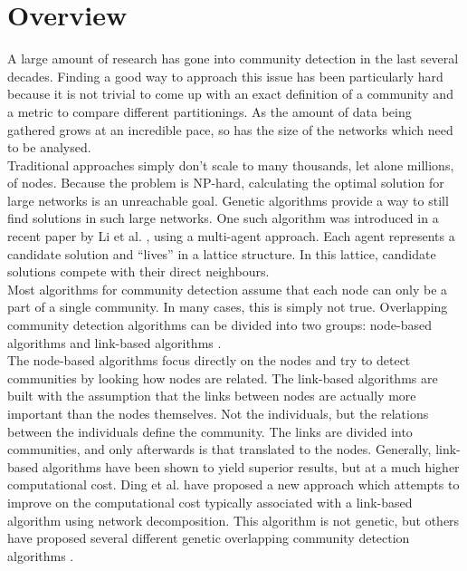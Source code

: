 \documentclass[twoside,twocolumn]{article}
\begin{document}
\section{Overview}
A large amount of research has gone into community detection in the last several decades. Finding a good way to approach this issue has been particularly hard because it is not trivial to come up with an exact definition of a community and a metric to compare different partitionings. As the amount of data being gathered grows at an incredible pace, so has the size of the networks which need to be analysed. \\ \newline
Traditional approaches simply don't scale to many thousands, let alone millions, of nodes. Because the problem is NP-hard, calculating the optimal solution for large networks is an unreachable goal. Genetic algorithms provide a way to still find solutions in such large networks. One such algorithm was introduced in a recent paper by Li et al. \cite{multiagent2016}, using a multi-agent approach. Each agent represents a candidate solution and ``lives'' in a lattice structure. In this lattice, candidate solutions compete with their direct neighbours. \\ \newline
Most algorithms for community detection assume that each node can only be a part of a single community. In many cases, this is simply not true. Overlapping community detection algorithms can be divided into two groups: node-based algorithms and link-based algorithms \cite{linkclus2013}.\\ \newline
The node-based algorithms focus directly on the nodes and try to detect communities by looking how nodes are related. The link-based algorithms are built with the assumption that the links between nodes are actually more important than the nodes themselves. Not the individuals, but the relations between the individuals define the community. The links are divided into communities, and only afterwards is that translated to the nodes. Generally, link-based algorithms have been shown to yield superior results, but at a much higher computational cost. Ding et al. \cite{Ding2016} have proposed a new approach which attempts to improve on the computational cost typically associated with a link-based algorithm using network decomposition. This algorithm is not genetic,  but others have proposed several different genetic overlapping community detection algorithms \cite{linkclus2013, Pizzuti2009, Dickinson2013}.\\
\end{document}

